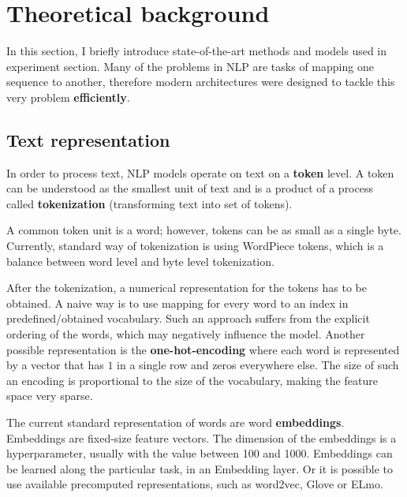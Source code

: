\chapter{Theoretical background}\label{theory}
In this section, I briefly introduce state-of-the-art methods and models used in experiment section. Many of the problems in NLP are tasks of mapping one sequence to another, therefore modern architectures were designed to tackle this very problem \textbf{efficiently}.




\section{Text representation}
In order to process text, NLP models operate on text on a \textbf{token} level. A token can be understood as the smallest unit of text and is a product of a process called \textbf{tokenization} (transforming text into set of tokens).

A common token unit is a word; however, tokens can be as small as a single byte. Currently, standard way of tokenization is using WordPiece tokens, which is a balance between word level and byte level tokenization.

After the tokenization, a numerical representation for the tokens has to be obtained. A naive way is to use mapping for every word to an index in predefined/obtained vocabulary. Such an approach suffers from the explicit ordering of the words, which may negatively influence the model. Another possible representation is the \textbf{one-hot-encoding} where each word is represented by a vector that has $1$ in a single row and zeros everywhere else. The size of such an encoding is proportional to the size of the vocabulary, making the feature space very sparse. 

The current standard representation of words are word \textbf{embeddings}. Embeddings are fixed-size feature vectors. The dimension of the embeddings is a hyperparameter, usually with the value between 100 and 1000. Embeddings can be learned along the particular task, in an Embedding layer. Or it is possible to use available precomputed representations, such as word2vec, Glove or ELmo.
\newpage





